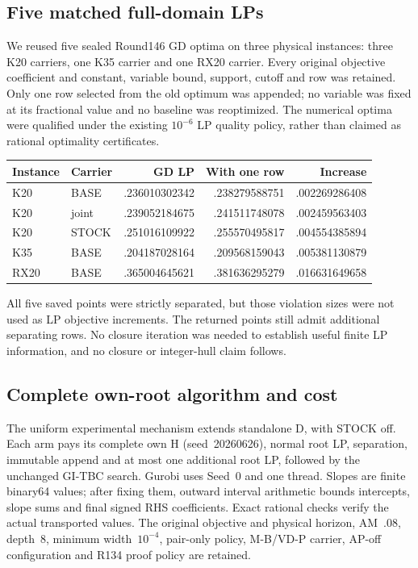 \subsection{Five matched full-domain LPs}
We reused five sealed Round146 GD optima on three physical instances:
three K20 carriers, one K35 carrier and one RX20 carrier. Every original
objective coefficient and constant, variable bound, support, cutoff and
row was retained. Only one row selected from the old optimum was appended;
no variable was fixed at its fractional value and no baseline was
reoptimized. The numerical optima were qualified under the existing
$10^{-6}$ LP quality policy, rather than claimed as rational optimality
certificates.
\begin{center}
\begin{tabular}{llrrr}
Instance & Carrier & GD LP & With one row & Increase\\
\hline
K20 & BASE & .236010302342 & .238279588751 & .002269286408\\
K20 & joint & .239052184675 & .241511748078 & .002459563403\\
K20 & STOCK & .251016109922 & .255570495817 & .004554385894\\
K35 & BASE & .204187028164 & .209568159043 & .005381130879\\
RX20 & BASE & .365004645621 & .381636295279 & .016631649658\\
\end{tabular}
\end{center}
All five saved points were strictly separated, but those violation sizes
were not used as LP objective increments. The returned points still admit
additional separating rows. No closure iteration was needed to establish
useful finite LP information, and no closure or integer-hull claim follows.

\subsection{Complete own-root algorithm and cost}
The uniform experimental mechanism extends standalone D, with STOCK off.
Each arm pays its complete own H (seed~20260626), normal root LP, separation,
immutable append and at most one additional root LP, followed by the
unchanged GI-TBC search. Gurobi uses Seed~0 and one thread. Slopes are finite
binary64 values; after fixing them, outward interval arithmetic bounds
intercepts, slope sums and final signed RHS coefficients. Exact rational
checks verify the actual transported values. The original objective and
physical horizon, AM~.08, depth~8, minimum width~$10^{-4}$, pair-only policy,
M-B/VD-P carrier, AP-off configuration and R134 proof policy are retained.

